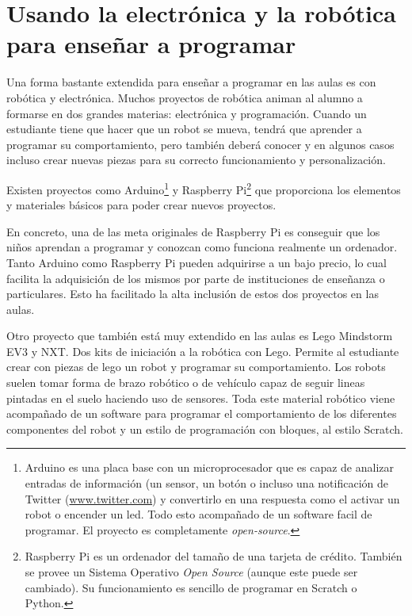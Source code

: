 \section{Usando la electrónica y la robótica para enseñar a programar}
\label{sec:electronica-robotica}

Una forma bastante extendida para enseñar a programar en las aulas es con robótica y electrónica. Muchos proyectos de robótica animan al alumno a formarse en dos grandes materias: electrónica y programación. Cuando un estudiante tiene que hacer que un robot se mueva, tendrá que aprender a programar su comportamiento, pero también deberá conocer y en algunos casos incluso crear nuevas piezas para su correcto funcionamiento y personalización.

Existen proyectos como Arduino\footnote{Arduino es una placa base con un microprocesador que es capaz de analizar entradas de información (un sensor, un botón o incluso una notificación de Twitter (\url{www.twitter.com}) y convertirlo en una respuesta como el activar un robot o encender un led. Todo esto acompañado de un software facil de programar. El proyecto es completamente \emph{\gls{open-source}}.}\cite{arduino} y Raspberry Pi\footnote{Raspberry Pi es un ordenador del tamaño de una tarjeta de crédito. También se provee un Sistema Operativo \emph{Open Source} (aunque este puede ser cambiado). Su funcionamiento es sencillo de programar en Scratch\cite{scratch} o Python\cite{python,lutz2013learning}.}\cite{raspberry-pi} que proporciona {\color{red}los elementos y materiales} básicos para poder crear nuevos proyectos.

En concreto, una de las meta originales de Raspberry Pi es conseguir que los niños aprendan a programar y conozcan como funciona realmente un ordenador. Tanto Arduino como Raspberry Pi pueden adquirirse a un bajo precio, lo cual facilita la adquisición de los mismos por parte de instituciones de enseñanza o particulares. Esto ha facilitado la alta inclusión de estos dos proyectos en las aulas.

Otro proyecto que también está muy extendido en las aulas es Lego Mindstorm EV3 y NXT\cite{lego-mindstorm}. Dos kits de iniciación a la robótica con Lego. Permite al estudiante crear con piezas de lego un robot y programar su comportamiento. Los robots suelen tomar forma de brazo robótico o de vehículo capaz de seguir lineas pintadas en el suelo haciendo uso de sensores. Toda este material robótico viene acompañado de un software para programar el comportamiento de los diferentes componentes del robot y un estilo de programación con bloques\cite{lego-mindstorm-programar}, al estilo Scratch.



